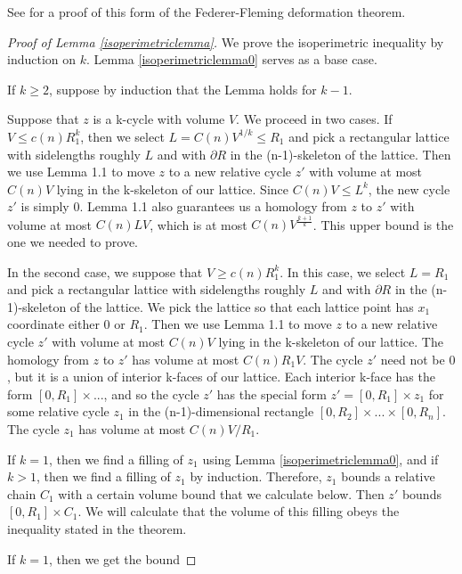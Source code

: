 \documentclass{amsart}
\newtheorem*{theorem 1}{Theorem 1}
\newtheorem*{theorem 2}{Theorem 2}
\newtheorem*{theorem 3}{Theorem 3}
\numberwithin{equation}{section}
\begin{document}
See \cite{G3} for a proof of this form of the Federer-Fleming deformation theorem.  

\begin{proof} [Proof of Lemma \ref{isoperimetriclemma}]

We prove the isoperimetric inequality by
induction on $k$.    Lemma \ref{isoperimetriclemma0} serves as a base case.

If $k \ge 2$,  suppose by induction that the Lemma holds for $k-1$.  

Suppose that $z$ is a k-cycle
with volume $V$.  We proceed in two cases.  If $V \le c(n)
R_1^k$, then we select $L = C(n) V^{1/k} \le R_1$ and pick a
rectangular lattice with sidelengths roughly $L$ and with
$\partial R$ in the (n-1)-skeleton of the lattice. Then we use
Lemma 1.1 to move $z$ to a new relative cycle $z'$ with volume at
most $C(n) V$ lying in the k-skeleton of our lattice. Since $C(n)
V \le L^k$, the new cycle $z'$ is simply $0$.  Lemma 1.1 also
guarantees us a homology from $z$ to $z'$ with volume at most
$C(n) L V$, which is at most $C(n) V^{\frac{k+1}{k}}$.  This
upper bound is the one we needed to prove.

In the second case, we suppose that $V \ge c(n) R_1^k$.  In this
case, we select $L = R_1$ and pick a rectangular lattice with
sidelengths roughly $L$ and with $\partial R$ in the
(n-1)-skeleton of the lattice.  We pick the lattice so that each
lattice point has $x_1$ coordinate either $0$ or $R_1$. Then we
use Lemma 1.1 to move $z$ to a new relative cycle $z'$ with
volume at most $C(n) V$ lying in the k-skeleton of our lattice. 
The homology from $z$ to $z'$ has volume at most $C(n) R_1 V$. 
The cycle $z'$ need not be $0$, but it is a union of interior
k-faces of our lattice.  Each interior k-face has the form $[0,
R_1] \times ...$, and so the cycle $z'$ has the special form $z'
= [0, R_1] \times z_1$ for some relative cycle $z_1$ in the
(n-1)-dimensional rectangle $[0, R_2] \times ... \times [0,
R_n]$.  The cycle $z_1$ has volume at most $C(n) V / R_1$.

If $k = 1$,  then we find a filling of $z_1$ using Lemma \ref{isoperimetriclemma0},  and if $k > 1$,  then we find a filling
of $z_1$ by induction.  
Therefore, $z_1$ bounds a relative chain $C_1$ with a certain
volume bound that we calculate below.  Then $z'$ bounds $[0, R_1]
\times C_1$.  We will calculate that the volume of this filling
obeys the inequality stated in the theorem.

If $k=1$,  then we get the bound 


\end{proof}
\end{document}
